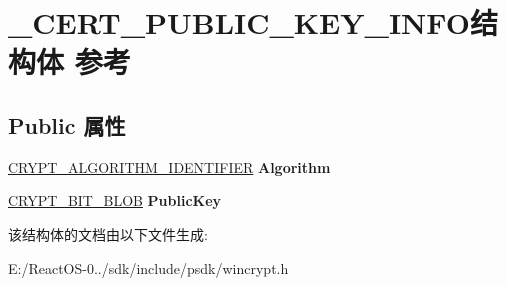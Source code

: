 \hypertarget{struct___c_e_r_t___p_u_b_l_i_c___k_e_y___i_n_f_o}{}\section{\+\_\+\+C\+E\+R\+T\+\_\+\+P\+U\+B\+L\+I\+C\+\_\+\+K\+E\+Y\+\_\+\+I\+N\+F\+O结构体 参考}
\label{struct___c_e_r_t___p_u_b_l_i_c___k_e_y___i_n_f_o}
\subsection*{Public 属性}
\begin{DoxyCompactItemize}
\item 
\mbox{\label{struct___c_e_r_t___p_u_b_l_i_c___k_e_y___i_n_f_o_adcc30d25fc90edd4b306a01a83681678}} 
\hyperlink{struct___c_r_y_p_t___a_l_g_o_r_i_t_h_m___i_d_e_n_t_i_f_i_e_r}{C\+R\+Y\+P\+T\+\_\+\+A\+L\+G\+O\+R\+I\+T\+H\+M\+\_\+\+I\+D\+E\+N\+T\+I\+F\+I\+ER} {\bfseries Algorithm}
\item 
\mbox{\label{struct___c_e_r_t___p_u_b_l_i_c___k_e_y___i_n_f_o_a341e50f5340dbe5f7953e0e04b1c1c10}} 
\hyperlink{struct___c_r_y_p_t___b_i_t___b_l_o_b}{C\+R\+Y\+P\+T\+\_\+\+B\+I\+T\+\_\+\+B\+L\+OB} {\bfseries Public\+Key}
\end{DoxyCompactItemize}


该结构体的文档由以下文件生成\+:\begin{DoxyCompactItemize}
\item 
E\+:/\+React\+O\+S-\/0../sdk/include/psdk/wincrypt.\+h\end{DoxyCompactItemize}
